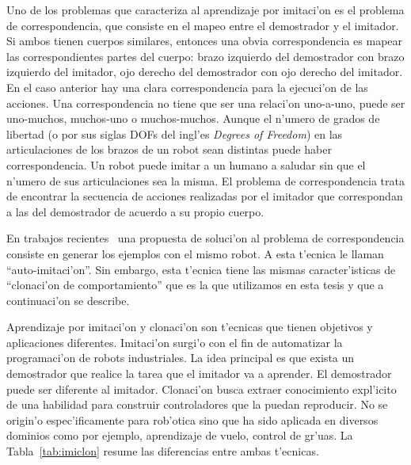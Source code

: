 \documentclass[11pt]{article}
\begin{document}
Uno de los problemas que caracteriza al \textsf{aprendizaje por imitaci'on} es el problema de correspondencia, que consiste en el mapeo entre el demostrador y el imitador. Si ambos tienen cuerpos similares, entonces una obvia correspondencia es mapear las correspondientes partes del cuerpo: brazo izquierdo del demostrador con brazo izquierdo del imitador, ojo derecho del demostrador con ojo derecho del imitador. En el caso anterior hay una clara correspondencia para la ejecuci'on de las acciones. Una correspondencia no tiene que ser una relaci'on uno-a-uno, puede ser uno-muchos, muchos-uno o muchos-muchos. Aunque el n'umero de grados de libertad (o por sus siglas DOFs del ingl'es \textit{Degrees of Freedom}) en las articulaciones de los brazos de un robot sean distintas puede haber correspondencia. Un robot puede imitar a un humano a saludar sin que el n'umero de sus articulaciones sea la misma. El problema de correspondencia trata de encontrar la secuencia de acciones realizadas por el imitador que correspondan a las del demostrador de acuerdo a su propio cuerpo.

En trabajos recientes~\cite{saunders:self} una propuesta de soluci'on al problema de correspondencia consiste en generar los ejemplos con el mismo robot. A esta t'ecnica le llaman ``auto-imitaci'on''. Sin embargo, esta t'ecnica tiene las mismas caracter'isticas de ``clonaci'on de comportamiento'' que es la que utilizamos en esta tesis y que a continuaci'on se describe.

\textsf{Aprendizaje por imitaci'on} y \textsf{clonaci'on} son t'ecnicas que tienen objetivos y aplicaciones diferentes. Imitaci'on surgi'o con el fin de automatizar la programaci'on de robots industriales. La idea principal es que exista un demostrador que realice la tarea que el imitador va a aprender. El demostrador puede ser diferente al imitador. \textsf{Clonaci'on} busca extraer conocimiento expl'icito de una habilidad para construir controladores que la puedan reproducir. No se origin'o espec'ificamente para rob'otica sino que ha sido aplicada en diversos dominios como por ejemplo, aprendizaje de vuelo, control de gr'uas. La Tabla~\ref{tab:imiclon} resume las diferencias entre ambas t'ecnicas.
\end{document}
